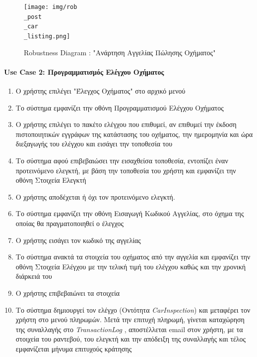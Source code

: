 \documentclass{../ol-softwaremanual}
\begin{document}
	\begin{figure}[htbp!]
		\texttt{[image: img/rob\\\_post\\\_car\\\_listing.png]}
		\caption{\en Robustness Diagram : "\gr Ανάρτηση Αγγελίας Πώλησης Οχήματος\en"\gr}
	\end{figure}
	
	
	
	
	\newpage
	
	
		\paragraph{\en Use Case 2: \gr Προγραμματισμός Ελέγχου Οχήματος}
		
		\begin{enumerate}
			\item Ο χρήστης επιλέγει \en"\gr Έλεγχος Οχήματος\en" \gr στο αρχικό μενού
			\item Το σύστημα εμφανίζει την οθόνη Προγραμματισμού Ελέγχου Οχήματος
			\item Ο χρήστης επιλέγει το πακέτο ελέγχου που επιθυμεί, αν επιθυμεί την έκδοση πιστοποιητικών εγγράφων της κατάστασης του οχήματος, την ημερομηνία και ώρα διεξαγωγής του ελέγχου και εισάγει την τοποθεσία του
			\item Το σύστημα αφού επιβεβαιώσει την εισαχθείσα τοποθεσία, εντοπίζει έναν προτεινόμενο ελεγκτή, με βάση την τοποθεσία του χρήστη και εμφανίζει την οθόνη Στοιχεία Ελεγκτή
			\item Ο χρήστης αποδέχεται ή όχι τον προτεινόμενο ελεγκτή. 
			\item Το σύστημα εμφανίζει την οθόνη Εισαγωγή Κωδικού Αγγελίας, στο όχημα της οποίας θα πραγματοποιηθεί ο έλεγχος		
			\item Ο χρήστης εισάγει τον κωδικό της αγγελίας
			\item Το σύστημα ανακτά τα στοιχεία του οχήματος από την αγγελία και εμφανίζει την οθόνη Στοιχεία Ελέγχου με την τελική τιμή του ελέγχου καθώς και την χρονική διάρκειά του
			\item Ο χρήστης επιβεβαιώνει τα στοιχεία
			\item Το σύστημα δημιουργεί τον ελέγχο (Οντότητα \en \textit{CarInspection}\gr) και μεταφέρει τον χρήστη στο μενού πληρωμών. Μετά την επιτυχή πληρωμή, γίνεται καταχώρηση της συναλλαγής στο \en \textit{TransactionLog} \gr, αποστέλλεται \en email \gr στον χρήστη, με τα στοιχεία του ραντεβού, του ελεγκτή και την απόδειξη της συναλλαγής και τέλος εμφανίζεται μήνυμα επιτυχούς κράτησης
		\end{enumerate}
		
\end{document}

